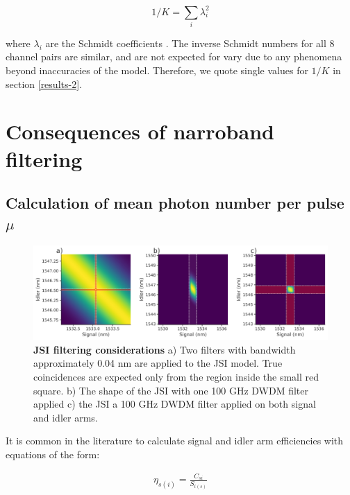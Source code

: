 \documentclass[11pt]{caltech_thesis} %
\begin{document}
$$1/K = \sum_i \lambda_i^2$$

where $\lambda_i$ are the Schmidt coefficients \autocite{ZielnickiKwiat2018SPDCmodel}. The inverse Schmidt numbers for all 8 channel pairs are similar, and are not expected for vary due to any phenomena beyond inaccuracies of the model. Therefore, we quote single values for $1/K$ in section \ref{results-2}.

\hypertarget{consequences-of-narroband-filtering}{%
\section{Consequences of narroband filtering}\label{consequences-of-narroband-filtering}}

\hypertarget{calculation-of-mean-photon-number-per-pulse-ux3bc}{%
\subsection{\texorpdfstring{Calculation of mean photon number per pulse \texorpdfstring{$\mu$}{mu}}{Calculation of mean photon number per pulse }}\label{calculation-of-mean-photon-number-per-pulse-ux3bc}}

\hypertarget{fig:narroband}{%
\begin{figure}
\centering
\includegraphics[width=1\textwidth,height=\textheight]{./chapter_05/figs/filter_considerations_light.pdf}
\caption[{JSI filtering considerations}]{\textbf{JSI filtering considerations} a) Two filters with bandwidth approximately 0.04 nm are applied to the JSI model. True coincidences are expected only from the region inside the small red square. b) The shape of the JSI with one 100 GHz DWDM filter applied c) the JSI a 100 GHz DWDM filter applied on both signal and idler arms.}
\label{fig:narroband}
\end{figure}
}

It is common in the literature to calculate signal and idler arm efficiencies with equations of the form:

\hypertarget{eq:regular_eff}{}{
\begin{align}
\eta_{s(i)}=\frac{C_{s i}}{S_{i(s)}} \label{eq:regular_eff}
\end{align}
}
\end{document}
